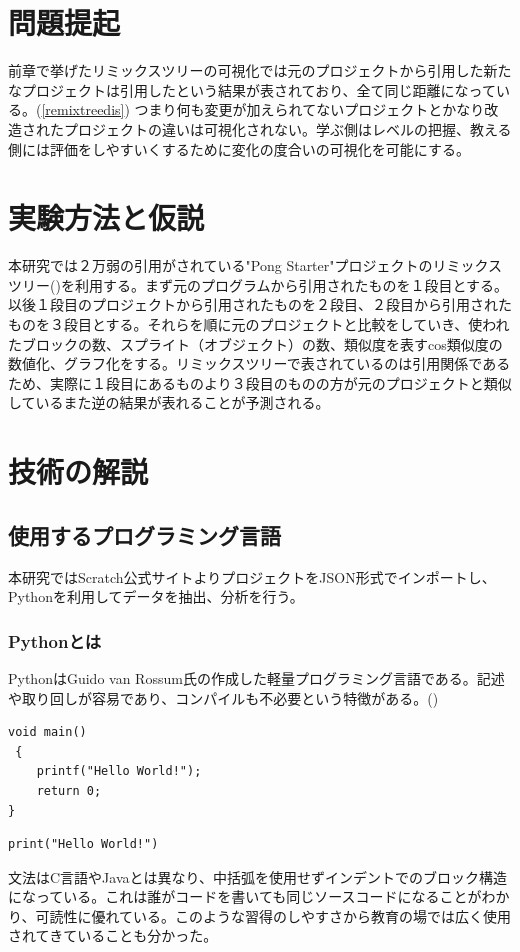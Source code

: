 \documentclass[a4paper,10pt,onecolumn,oneside,openany]{jsbook}
\begin{document}
\section{問題提起}
前章で挙げたリミックスツリーの可視化では元のプロジェクトから引用した新たなプロジェクトは引用したという結果が表されており、全て同じ距離になっている。(\ref{remixtreedis})
つまり何も変更が加えられてないプロジェクトとかなり改造されたプロジェクトの違いは可視化されない。学ぶ側はレベルの把握、教える側には評価をしやすいくするために変化の度合いの可視化を可能にする。
 \section{実験方法と仮説}
本研究では２万弱の引用がされている"Pong Starter"プロジェクトのリミックスツリー(\cite{pongret})を利用する。まず元のプログラムから引用されたものを１段目とする。以後１段目のプロジェクトから引用されたものを２段目、２段目から引用されたものを３段目とする。それらを順に元のプロジェクトと比較をしていき、使われたブロックの数、スプライト（オブジェクト）の数、類似度を表すcos類似度の数値化、グラフ化をする。リミックスツリーで表されているのは引用関係であるため、実際に１段目にあるものより３段目のものの方が元のプロジェクトと類似しているまた逆の結果が表れることが予測される。
\newpage
 \section{技術の解説}
\subsection{使用するプログラミング言語}
本研究ではScratch公式サイトよりプロジェクトをJSON形式でインポートし、Pythonを利用してデータを抽出、分析を行う。
\subsubsection{Pythonとは}
PythonはGuido van Rossum氏の作成した軽量プログラミング言語である。記述や取り回しが容易であり、コンパイルも不必要という特徴がある。(\cite{python})
 \begin{lstlisting}[caption=C言語,label=clan]
 void main()
 {
 	printf("Hello World!");
	return 0;
}
 \end{lstlisting}
 
 
 \begin{lstlisting}[caption=Python,label=python]
 print("Hello World!")
 \end{lstlisting}
 
文法はC言語やJavaとは異なり、中括弧を使用せずインデントでのブロック構造になっている。これは誰がコードを書いても同じソースコードになることがわかり、可読性に優れている。このような習得のしやすさから教育の場では広く使用されてきていることも分かった。
\end{document}
